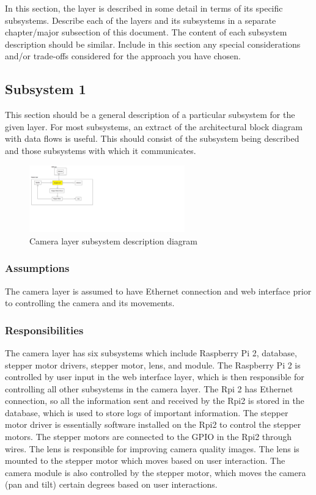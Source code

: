 In this section, the layer is described in some detail in terms of its specific subsystems. Describe each of the layers and its subsystems in a separate chapter/major subsection of this document. The content of each subsystem description should be similar. Include in this section any special considerations and/or trade-offs considered for the approach you have chosen.

\subsection{Subsystem 1}
This section should be a general description of a particular subsystem for the given layer. For most subsystems, an extract of the architectural block diagram with data flows is useful. This should consist of the subsystem being described and those subsystems with which it communicates.

\begin{figure}[h!]
	\centering
 	\includegraphics[width=0.60\textwidth]{images/camera_layer.png}
 \caption{Camera layer subsystem description diagram}
\end{figure}

\subsubsection{Assumptions}
The camera layer is assumed to have Ethernet connection and web interface prior to controlling the camera and its movements.  

\subsubsection{Responsibilities}
The camera layer has six subsystems which include Raspberry Pi 2, database, stepper motor drivers, stepper motor, lens, and module. The Raspberry Pi 2 is controlled by user input in the web interface layer, which is then responsible for controlling all other subsystems in the camera layer. The Rpi 2 has Ethernet connection, so all the information sent and received by the Rpi2 is stored in the database, which is used to store logs of important information. The stepper motor driver is essentially software installed on the Rpi2 to control the stepper motors. The stepper motors are connected to the GPIO in the Rpi2 through wires. The lens is responsible for improving camera quality images. The lens is mounted to the stepper motor which moves based on user interaction. The camera module is also controlled by the stepper motor, which moves the camera (pan and tilt) certain degrees based on user interactions.

